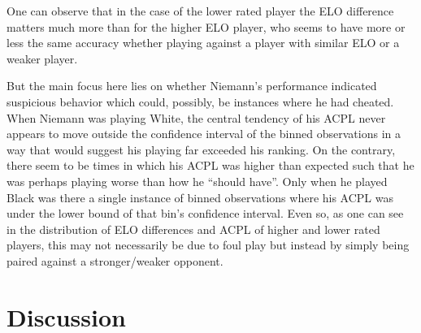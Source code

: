 \documentclass[12pt, letterpaper, titlepage]{article}
\begin{document}
One can observe that in the case of the lower rated player the ELO difference matters much more than for the higher ELO player, who seems to have more or less the same accuracy whether playing against a player with similar ELO or a weaker player.

But the main focus here lies on whether Niemann's performance indicated suspicious behavior which could, possibly, be instances where he had cheated. When Niemann was playing White, the central tendency of his ACPL never appears to move outside the confidence interval of the binned observations in a way that would suggest his playing far exceeded his ranking. On the contrary, there seem to be times in which his ACPL was higher than expected such that he was perhaps playing worse than how he “should have”. Only when he played Black was there a single instance of binned observations where his ACPL was under the lower bound of that bin's confidence interval. Even so, as one can see in the distribution of ELO differences and ACPL of higher and lower rated players, this may not necessarily be due to foul play but instead by simply being paired against a stronger/weaker opponent.

\section*{Discussion}
\label{sec:disc}
\end{document}
